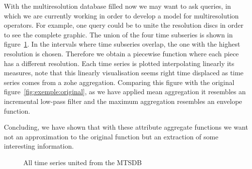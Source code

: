 With the multiresolution database filled now we may want to ask
queries, in which we are currently working in order to develop a model
for multiresolution operators.  For example, one query could be to
unite the resolution discs in order to see the complete graphic.  The
union of the four time subseries is shown in
figure~\ref{fig:exemple:4mrdtot}.  In the intervals where time
subseries overlap, the one with the highest resolution is
chosen. Therefore we obtain a piecewise function where each piece has
a different resolution.  Each time series is plotted interpolating
linearly its measures, note that this linearly visualisation seems
right time displaced as time series comes from a zohe aggregation.
Comparing this figure with the original
figure~\ref{fig:exemple:original}, as we have applied mean aggregation
it resembles an incremental low-pass filter and the maximum
aggregation resembles an envelope function. 

Concluding, we have shown that with these attribute aggregate
functions we want not an approximation to the original function but an
extraction of some interesting information.




\begin{figure}[tp]
  \centering
  
  \caption{All time series united from the MTSDB}
  \label{fig:exemple:4mrdtot}
\end{figure}



